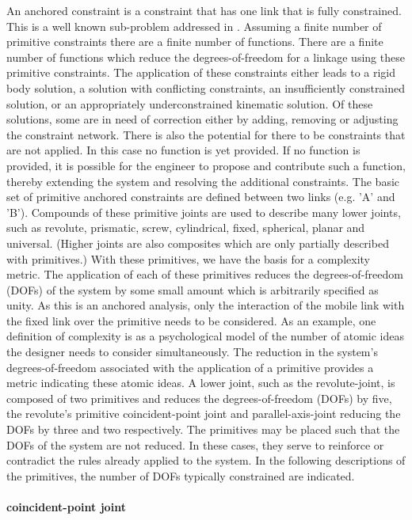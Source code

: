 \documentclass[]{report}
\begin{document}
An anchored constraint is a constraint that has one link that is fully constrained. 
This is a well known sub-problem addressed in \citep{kramer1991sgcs}. 
Assuming a finite number of primitive constraints there are a finite number of functions. 
There are a finite number of functions which reduce 
the degrees-of-freedom for a linkage using these primitive constraints. 
The application of these constraints either leads to a rigid body solution, 
a solution with conflicting constraints, an insufficiently constrained solution, 
or an appropriately underconstrained kinematic solution. 
Of these solutions, some are in need of correction either by adding, 
removing or adjusting the constraint network. 
There is also the potential for there to be constraints that are not applied. 
In this case no function is yet provided. 
If no function is provided, it is possible for the engineer to propose 
and contribute such a function, thereby extending the system and resolving the additional constraints.
The basic set of primitive anchored constraints are defined between two links (e.g. 'A' and 'B'). 
Compounds of these primitive joints are used to describe many lower joints, 
such as revolute, prismatic, screw, cylindrical, fixed, spherical, planar and universal. 
(Higher joints are also composites which are only partially described with primitives.) 
With these primitives, we have the basis for a complexity metric. 
The application of each of these primitives reduces the degrees-of-freedom (DOFs) 
of the system by some small amount which is arbitrarily specified as unity. 
As this is an anchored analysis, only the interaction of the mobile link 
with the fixed link over the primitive needs to be considered. 
As an example, one definition of complexity is as a psychological model 
of the number of atomic ideas the designer needs to consider simultaneously. 
The reduction in the system's degrees-of-freedom associated with the application 
of a primitive provides a metric indicating these atomic ideas. 
A lower joint, such as the revolute-joint, is composed of two primitives 
and reduces the degrees-of-freedom (DOFs) by five, 
the revolute's primitive coincident-point joint and 
parallel-axis-joint reducing the DOFs by three and two respectively.
The primitives may be placed such that the DOFs of the system are not reduced. 
In these cases, they serve to reinforce or contradict the rules 
already applied to the system. 
In the following descriptions of the primitives, 
the number of DOFs typically constrained are indicated.

\paragraph{coincident-point joint}
\end{document}
